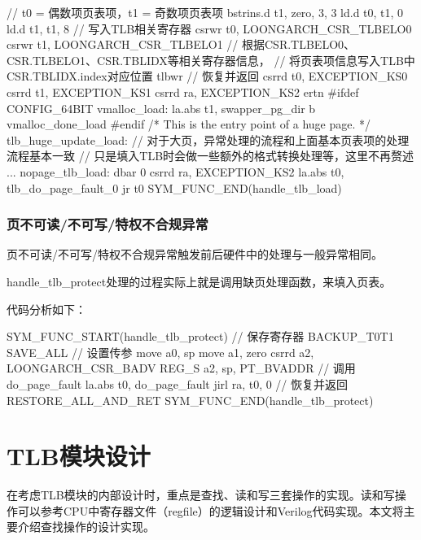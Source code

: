 \begin{CodeBlock}[language=BookLoongArch]
    // t0 = 偶数项页表项，t1 = 奇数项页表项
    bstrins.d    t1, zero, 3, 3
    ld.d        t0, t1, 0
    ld.d        t1, t1, 8
    // 写入TLB相关寄存器
    csrwr        t0, LOONGARCH_CSR_TLBELO0
    csrwr        t1, LOONGARCH_CSR_TLBELO1
    // 根据CSR.TLBELO0、CSR.TLBELO1、CSR.TBLIDX等相关寄存器信息，
    // 将页表项信息写入TLB中CSR.TBLIDX.index对应位置
    tlbwr
    // 恢复并返回
    csrrd        t0, EXCEPTION_KS0
    csrrd        t1, EXCEPTION_KS1
    csrrd        ra, EXCEPTION_KS2
    ertn
#ifdef CONFIG_64BIT
vmalloc_load:
    la.abs        t1, swapper_pg_dir
    b        vmalloc_done_load
#endif
    /* This is the entry point of a huge page. */
tlb_huge_update_load:
    // 对于大页，异常处理的流程和上面基本页表项的处理流程基本一致
    // 只是填入TLB时会做一些额外的格式转换处理等，这里不再赘述
    ...
nopage_tlb_load:
    dbar        0
    csrrd        ra, EXCEPTION_KS2
    la.abs        t0, tlb_do_page_fault_0
    jr        t0
SYM_FUNC_END(handle_tlb_load)
\end{CodeBlock}

\subsubsection{页不可读/不可写/特权不合规异常}\label{sec:10-mmu-007}

页不可读/不可写/特权不合规异常触发前后硬件中的处理与一般异常相同。

handle\_tlb\_protect处理的过程实际上就是调用缺页处理函数，来填入页表。

代码分析如下：

\begin{CodeBlock}[language=BookLoongArch]
SYM_FUNC_START(handle_tlb_protect)
    // 保存寄存器
    BACKUP_T0T1
    SAVE_ALL
    // 设置传参
    move    a0, sp
    move    a1, zero
    csrrd    a2, LOONGARCH_CSR_BADV
    REG_S    a2, sp, PT_BVADDR
    // 调用do_page_fault
    la.abs    t0, do_page_fault
    jirl    ra, t0, 0
    // 恢复并返回
    RESTORE_ALL_AND_RET
SYM_FUNC_END(handle_tlb_protect)
\end{CodeBlock}

\section{TLB模块设计}\label{sec:10-mmu-008}

在考虑TLB模块的内部设计时，重点是查找、读和写三套操作的实现。读和写操作可以参考CPU中寄存器文件（regfile）的逻辑设计和Verilog代码实现。本文将主要介绍查找操作的设计实现。

